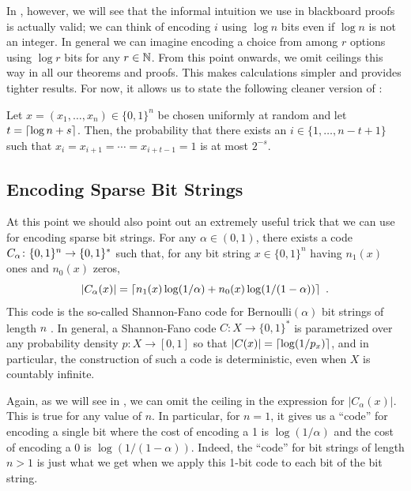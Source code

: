 \documentclass{patmorin}
\newenvironment{customthm}[1]
  {\renewcommand\theinnercustomthm{#1}\innercustomthm}
  {\endinnercustomthm}
\begin{document}
In , however, we will see that the informal intuition we
use in blackboard proofs is actually valid; we can think of encoding
$i$ using $\log n$ bits even if $\log n$ is not an integer.  In
general we can imagine encoding a choice from among $r$ options using
$\log r$ bits for any $r\in\mathbb{N}$.  From this point onwards, we omit
ceilings this way in all our theorems and proofs. This makes
calculations simpler and provides tighter results.  For now, it allows
us to state the following cleaner version of :

\begin{customthm}{\ref*{thm:runs-i}b}
  Let $x=(x_1,\ldots,x_n)\in\{0,1\}^n$ be chosen uniformly at random
  and let $t = {\lceil \log n + s \rceil}$. Then, the probability that there
  exists an $i\in\{1,\ldots,n-t+1\}$ such that
  $x_i=x_{i+1}=\cdots=x_{i+t-1}=1$ is at most $2^{-s}$.
\end{customthm}

\subsection{Encoding Sparse Bit Strings}

At this point we should also point out an extremely useful trick that
we can use for encoding sparse bit strings. For any $\alpha\in(0,1)$,
there exists a code $C_\alpha\colon \{0,1\}^n\rightarrow \{0,1\}^*$
such that, for any bit string $x\in\{0,1\}^n$ having $n_1(x)$ ones and
$n_0(x)$ zeros,
\begin{equation}
  |C_\alpha(x)| = \lceil n_1(x)\log(1/\alpha) + n_0(x)\log(1/(1-\alpha)) \rceil \enspace .
  \eqlabel{sparse-bitstring-i}
\end{equation}
This code is the so-called Shannon-Fano code for
$\mathrm{Bernoulli}(\alpha)$ bit strings of length $n$
\cite{fano:transmission,shannon:mathematical}. In general, a
Shannon-Fano code $C : X \to \{0, 1\}^*$ is parametrized over any
probability density $p : X \to [0, 1]$ so that
$|C(x)| = {\lceil \log (1/p_x) \rceil}$, and in particular, the construction of
such a code is deterministic, even when $X$ is countably infinite.

Again, as we will see in , we can omit the ceiling in the
expression for $|C_\alpha(x)|$.  This is true for any value of $n$. In
particular, for $n=1$, it gives us a ``code'' for encoding a single
bit where the cost of encoding a 1 is $\log(1/\alpha)$ and the cost of
encoding a 0 is $\log(1/(1-\alpha))$.  Indeed, the ``code'' for bit
strings of length $n>1$ is just what we get when we apply this 1-bit
code to each bit of the bit string.
\end{document}
